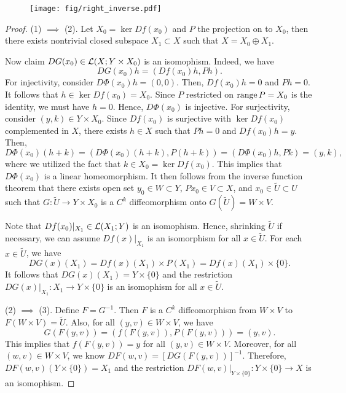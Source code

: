 \documentclass[a4paper]{article}
\begin{document}
\begin{figure}[!ht]
  \centering
  \texttt{[image: fig/right\_inverse.pdf]}
\end{figure}

\begin{proof}
(1) $\implies$ (2). Let $X_0 = \ker Df(x_0)$ and $P$ the 
projection on to $X_0$, then there exists nontrivial 
closed subspace $X_1 \subset X$ such that $X = X_0 \oplus
X_1$. 

Now claim $DG(x_0) \in \mathcal{L}(X; Y \times X_0)$ 
is an isomophism. Indeed, we have 
\[
DG(x_0)h = (Df(x_0)h, Ph).
\] 
For injectivity, consider $D\Phi(x_0)h = (0, 0)$. Then,
$Df(x_0) h = 0$ and $Ph = 0$. It follows that 
$h \in \ker Df(x_0) = X_0$. Since $P$ restricted on 
$\operatorname{range} P = X_0$ is the identity, we must have $h = 0$.
Hence, $D\Phi(x_0)$ is injective. For surjectivity, 
consider $(y, k) \in Y \times X_0$. Since $Df(x_0)$ is 
surjective with $\ker Df(x_0)$ complemented in $X$, 
there exists $h \in X$ such that $Ph = 0$ and $Df(x_0) h = y$.
Then, 
\[
D\Phi(x_0)(h + k) = (D\Phi(x_0)(h + k), P(h + k)) 
= (D\Phi(x_0) h, Pk) = (y, k),
\]
where we utilized the fact that $k \in X_0 = \ker Df(x_0)$.
This implies that $D\Phi(x_0)$ is a linear homeomorphism.
It then follows from the inverse function theorem that 
there exists open set $y_0 \in W \subset Y$, $P x_0 
\in V \subset X$, and $x_0 \in \tilde{U} \subset U$ 
such that $G : \tilde{U} \to Y \times X_0$ is a 
$C^k$ diffeomorphism onto $G(\tilde{U}) = W \times V$.

Note that $Df(x_0) \vert_{X_1} \in \mathcal{L}(X_1 ; Y)$ 
is an isomophism. Hence, shrinking $\tilde{U}$ if necessary,
we can assume $Df(x) \vert_{X_1}$ is an isomorphism for 
all $x \in \tilde{U}$. For each $x \in \tilde{U}$, we have
\[
DG(x) (X_1) = Df(x) (X_1) \times P(X_1) = Df(x) (X_1) 
\times \{0\}.
\]
It follows that $DG(x)(X_1) = Y \times \{0\}$
and the restriction $DG(x) \vert_{X_1} : X_1 \to Y 
\times \{0\}$ is an isomophism for all $x \in \tilde{U}$.

(2) $\implies$ (3). Define $F = G^{-1}$. Then $F$ is a 
$C^k$ diffeomorphism from $W \times V$ to $F(W \times V) 
= \tilde{U}$. Also, for all 
$(y, v) \in W \times V$, we have 
\[
G(F(y, v)) = (f(F(y, v)), P(F(y, v))) = (y, v).
\]
This implies that $f(F(y, v)) = y$ for all $(y, v) \in 
W \times V$. Moreover, for all $(w, v) \in W \times V$, we
know $DF(w, v) = [DG(F(y, v))]^{-1}$.  Therefore, $DF(w, v)
(Y \times \{0\}) = X_1$ and the restriction $DF(w, v) 
\vert_{Y \times \{0\}} : Y \times \{0\} \to X$ is an 
isomophism.


\end{proof}
\end{document}
